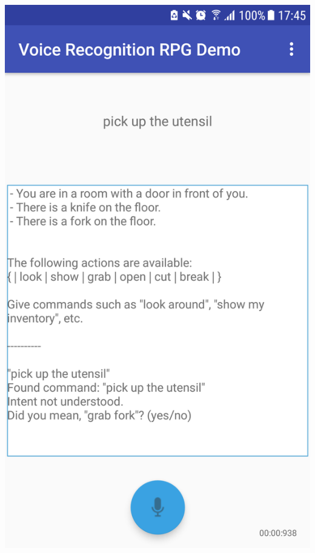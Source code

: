 \documentclass[11pt]{article}
\begin{document}
\begin{appendices}
\begin{center}
\includegraphics[scale=0.18]{utensil-1.png}

\end{center}
\end{appendices}
\end{document}
